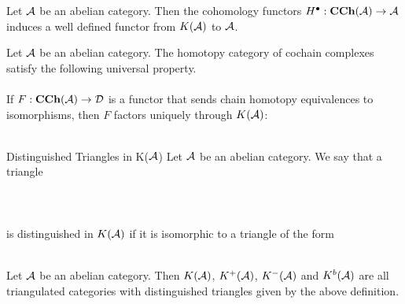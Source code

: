 \documentclass[a4paper]{article}
\begin{document}
\begin{lmm}{}{} Let $\mathcal{A}$ be an abelian category. Then the cohomology functors $H^\bullet:\bold{CCh}(\mathcal{A})\to\mathcal{A}$ induces a well defined functor from $K(\mathcal{A})$ to $\mathcal{A}$. 
\end{lmm}

\begin{prp}{}{} Let $\mathcal{A}$ be an abelian category. The homotopy category of cochain complexes satisfy the following universal property. \\~\\

If $F:\bold{CCh}(\mathcal{A})\to\mathcal{D}$ is a functor that sends chain homotopy equivalences to isomorphisms, then $F$ factors uniquely through $K(\mathcal{A})$: \\~\\
\end{prp}

\begin{defn}{Distinguished Triangles in K($\mathcal{A}$)}{} Let $\mathcal{A}$ be an abelian category. We say that a triangle \\~\\
\\~\\
is distinguished in $K(\mathcal{A})$ if it is isomorphic to a triangle of the form \\~\\
\end{defn}

\begin{lmm}{}{} Let $\mathcal{A}$ be an abelian category. Then $K(\mathcal{A})$, $K^+(\mathcal{A})$, $K^-(\mathcal{A})$ and $K^b(\mathcal{A})$ are all triangulated categories with distinguished triangles given by the above definition. 
\end{lmm}
\end{document}

